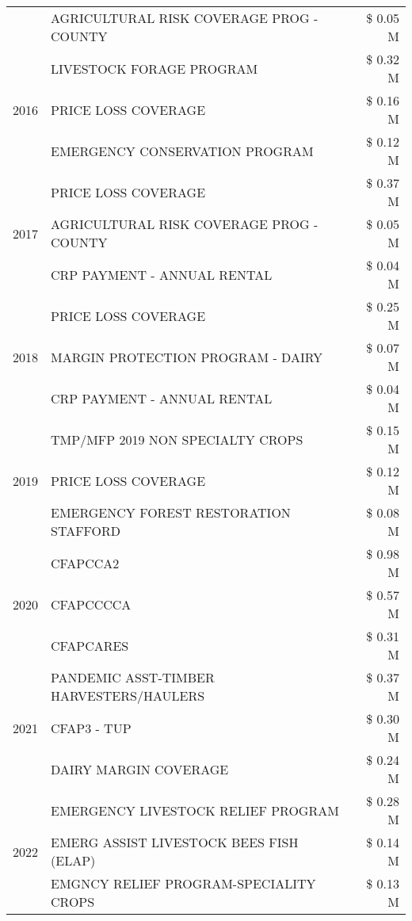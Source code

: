 \begin{tabular}{llr}
 & AGRICULTURAL RISK COVERAGE PROG - COUNTY & \$ 0.05 M \\
\cline{1-3}
\multirow[t]{3}{*}{2016} & LIVESTOCK FORAGE PROGRAM & \$ 0.32 M \\
 & PRICE LOSS COVERAGE & \$ 0.16 M \\
 & EMERGENCY CONSERVATION PROGRAM & \$ 0.12 M \\
\cline{1-3}
\multirow[t]{3}{*}{2017} & PRICE LOSS COVERAGE & \$ 0.37 M \\
 & AGRICULTURAL RISK COVERAGE PROG - COUNTY & \$ 0.05 M \\
 & CRP PAYMENT - ANNUAL RENTAL & \$ 0.04 M \\
\cline{1-3}
\multirow[t]{3}{*}{2018} & PRICE LOSS COVERAGE & \$ 0.25 M \\
 & MARGIN PROTECTION PROGRAM - DAIRY & \$ 0.07 M \\
 & CRP PAYMENT - ANNUAL RENTAL & \$ 0.04 M \\
\cline{1-3}
\multirow[t]{3}{*}{2019} & TMP/MFP 2019 NON SPECIALTY CROPS & \$ 0.15 M \\
 & PRICE LOSS COVERAGE & \$ 0.12 M \\
 & EMERGENCY FOREST RESTORATION STAFFORD & \$ 0.08 M \\
\cline{1-3}
\multirow[t]{3}{*}{2020} & CFAPCCA2 & \$ 0.98 M \\
 & CFAPCCCCA & \$ 0.57 M \\
 & CFAPCARES & \$ 0.31 M \\
\cline{1-3}
\multirow[t]{3}{*}{2021} & PANDEMIC ASST-TIMBER HARVESTERS/HAULERS & \$ 0.37 M \\
 & CFAP3 - TUP & \$ 0.30 M \\
 & DAIRY MARGIN COVERAGE & \$ 0.24 M \\
\cline{1-3}
\multirow[t]{3}{*}{2022} & EMERGENCY LIVESTOCK RELIEF PROGRAM & \$ 0.28 M \\
 & EMERG ASSIST LIVESTOCK BEES FISH (ELAP) & \$ 0.14 M \\
 & EMGNCY RELIEF PROGRAM-SPECIALITY CROPS & \$ 0.13 M \\
\cline{1-3}
\bottomrule
\end{tabular}
